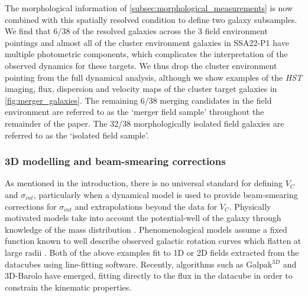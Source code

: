\documentclass[fleqn,usenatbib]{mn2e}
\begin{document}
The morphological information of \cref{subsec:morphological_measurements} is now combined with this spatially resolved condition to define two galaxy subsamples.
We find that 6/38 of the resolved galaxies across the 3 field environment pointings and almost all of the cluster environment galaxies in SSA22-P1 have multiple photometric components, which complicates the interpretation of the observed dynamics for these targets.
We thus drop the cluster environment pointing from the full dynamical analysis, although we show examples of the {\em HST} imaging, flux, dispersion and velocity maps of the cluster target galaxies in \cref{fig:merger_galaxies}.
The remaining 6/38 merging candidates in the field environment are referred to as the `merger field sample' throughout the remainder of the paper.
The 32/38 morphologically isolated field galaxies are referred to as the `isolated field sample'.

\subsubsection{3D modelling and beam-smearing corrections}\label{subsec:3d_modelling}

As mentioned in the introduction, there is no universal standard for defining $V_{C}$ and $\sigma_{int}$, particularly when a dynamical model is used to provide beam-smearing corrections for $\sigma_{int}$ and extrapolations beyond the data for $V_{C}$.
Physically motivated models take into account the potential-well of the galaxy through knowledge of the mass distribution \citep[e.g.][]{Genzel2008,ForsterSchreiber2009,Gnerucci2011,Wisnioski2015,Swinbank2017}.
Phenomenological models assume a fixed function known to well describe observed galactic rotation curves which flatten at large radii \citep[e.g.][]{Epinat2010,Epinat2012,Swinbank2012,Stott2016,Harrison2017}.
Both of the above examples fit to 1D or 2D fields extracted from the datacubes using line-fitting software.
Recently, algorithms such as Galpak$^{3D}$ \citep{Bouche2015} and 3D-Barolo \citep{DiTeodoro2015} have emerged, fitting directly to the flux in the datacube in order to constrain the kinematic properties.
\end{document}
